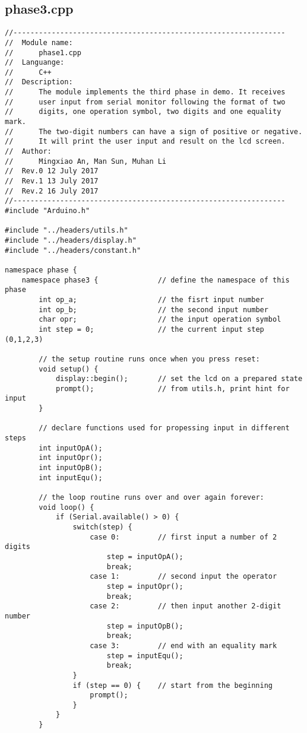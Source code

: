 \subsection{phase3.cpp}
\begin{verbatim}
//----------------------------------------------------------------
//  Module name:
//      phase1.cpp
//  Languange:
//      C++
//  Description:
//      The module implements the third phase in demo. It receives 
//      user input from serial monitor following the format of two 
//      digits, one operation symbol, two digits and one equality mark.
//      The two-digit numbers can have a sign of positive or negative.
//      It will print the user input and result on the lcd screen.
//  Author:
//      Mingxiao An, Man Sun, Muhan Li
//  Rev.0 12 July 2017
//  Rev.1 13 July 2017
//  Rev.2 16 July 2017
//----------------------------------------------------------------
#include "Arduino.h"

#include "../headers/utils.h"
#include "../headers/display.h"
#include "../headers/constant.h"

namespace phase {
    namespace phase3 {              // define the namespace of this phase
        int op_a;                   // the fisrt input number
        int op_b;                   // the second input number
        char opr;                   // the input operation symbol
        int step = 0;               // the current input step (0,1,2,3)

        // the setup routine runs once when you press reset:
        void setup() {
            display::begin();       // set the lcd on a prepared state
            prompt();               // from utils.h, print hint for input
        }

        // declare functions used for propessing input in different steps
        int inputOpA();
        int inputOpr();
        int inputOpB();
        int inputEqu();

        // the loop routine runs over and over again forever:
        void loop() {
            if (Serial.available() > 0) {
                switch(step) {      
                    case 0:         // first input a number of 2 digits
                        step = inputOpA(); 
                        break;  
                    case 1:         // second input the operator
                        step = inputOpr(); 
                        break;  
                    case 2:         // then input another 2-digit number
                        step = inputOpB(); 
                        break;  
                    case 3:         // end with an equality mark
                        step = inputEqu(); 
                        break;  
                }
                if (step == 0) {    // start from the beginning
                    prompt();
                }
            }
        }


\end{verbatim}
